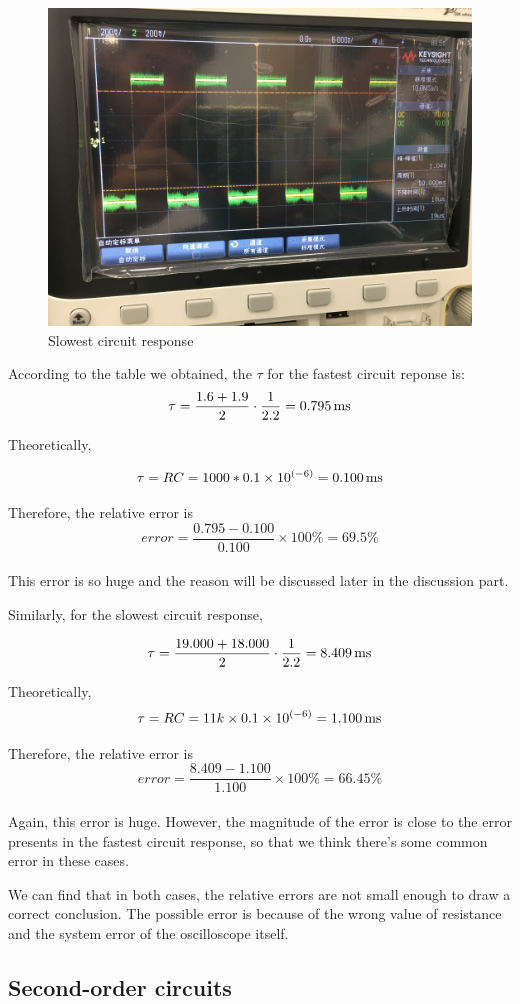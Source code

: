 \documentclass{article}
\begin{document}
  \begin{figure}[htp]
  \centering
  \includegraphics[width=.6\textwidth]{Figure2.jpg}
  \caption{Slowest circuit response}
  \label{img} 
\end{figure}

According to the table we obtained, the $\tau $ for the fastest circuit reponse is:
$$\tau=\frac{1.6+1.9}{2}\cdot\frac{1}{2.2}=0.795\,\rm{ms}$$

Theoretically,

$$\tau=RC=1000* 0.1\times 10^{(-6)}= 0.100\,\rm{ms}$$

Therefore, the relative error is $$error = \frac{0.795-0.100}{0.100}\times 100\% = 69.5 \%$$\\ This error is so huge and the reason will be discussed later in the discussion part.

Similarly, for the slowest circuit response,

$$\tau=\frac{19.000+18.000}{2}\cdot\frac{1}{2.2}=8.409\,\rm{ms}$$

Theoretically,
$$\tau=RC=11k \times 0.1\times 10^{(-6)}= 1.100\,\rm{ms}$$

Therefore, the relative error is $$error = \frac{8.409-1.100}{1.100}\times 100\% = 66.45 \%$$\\
Again, this error is huge. However, the magnitude of the error is close to the error presents in the fastest circuit response, so that we think there's some common error in these cases.

We can find that in both cases, the relative errors are not small enough to draw a correct conclusion. The possible error is because of the wrong value of resistance and the system error of the oscilloscope itself. 


\subsection{Second-order circuits}
\end{document}
